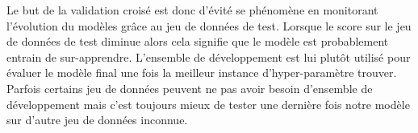 \documentclass[french, 14pt]{memoir}
\begin{document}
Le but de la validation croisé est donc d'évité se phénomène en monitorant l'évolution du modèles grâce au jeu de données de test. Lorsque le score sur le jeu de données de test diminue alors cela signifie que le modèle est probablement entrain de sur-apprendre. 
L'ensemble de développement est lui plutôt utilisé pour évaluer le modèle final une fois la meilleur instance d'hyper-paramètre trouver. Parfois certains jeu de données peuvent ne pas avoir besoin d'ensemble de développement mais c'est toujours mieux de tester une dernière fois notre modèle sur d'autre jeu de données inconnue. 
\end{document}
